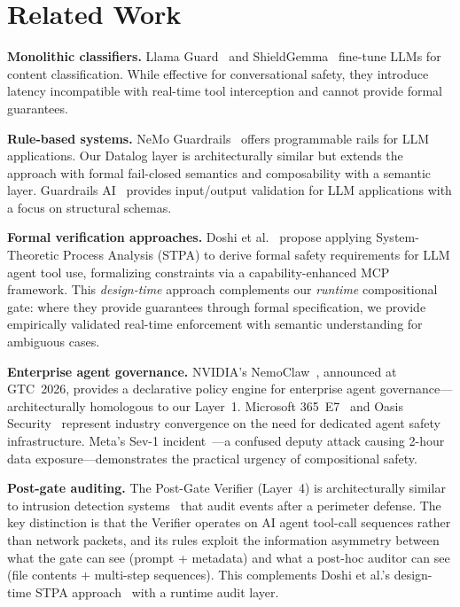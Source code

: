 \documentclass[conference]{IEEEtran}
\begin{document}
\section{Related Work}

\textbf{Monolithic classifiers.} Llama Guard~\cite{inan2023llamaguard} and ShieldGemma~\cite{zeng2024shieldgemma} fine-tune LLMs for content classification. While effective for conversational safety, they introduce latency incompatible with real-time tool interception and cannot provide formal guarantees.

\textbf{Rule-based systems.} NeMo Guardrails~\cite{rebedea2023nemoguardrails} offers programmable rails for LLM applications. Our Datalog layer is architecturally similar but extends the approach with formal fail-closed semantics and composability with a semantic layer. Guardrails AI~\cite{guardrailsai2024} provides input/output validation for LLM applications with a focus on structural schemas.

\textbf{Formal verification approaches.} Doshi et al.~\cite{doshi2026verifiable} propose applying System-Theoretic Process Analysis (STPA) to derive formal safety requirements for LLM agent tool use, formalizing constraints via a capability-enhanced MCP framework. This \emph{design-time} approach complements our \emph{runtime} compositional gate: where they provide guarantees through formal specification, we provide empirically validated real-time enforcement with semantic understanding for ambiguous cases.

\textbf{Enterprise agent governance.} NVIDIA's NemoClaw~\cite{nvidia2026nemoclaw}, announced at GTC~2026, provides a declarative policy engine for enterprise agent governance---architecturally homologous to our Layer~1. Microsoft 365~E7~\cite{microsoft2026e7} and Oasis Security~\cite{oasis2026funding} represent industry convergence on the need for dedicated agent safety infrastructure. Meta's Sev-1 incident~\cite{meta2026sev1}---a confused deputy attack causing 2-hour data exposure---demonstrates the practical urgency of compositional safety.

\textbf{Post-gate auditing.} The Post-Gate Verifier (Layer~4) is architecturally similar to intrusion detection systems~\cite{liao2013intrusion} that audit events after a perimeter defense. The key distinction is that the Verifier operates on AI agent tool-call sequences rather than network packets, and its rules exploit the information asymmetry between what the gate can see (prompt + metadata) and what a post-hoc auditor can see (file contents + multi-step sequences). This complements Doshi et al.'s design-time STPA approach~\cite{doshi2026verifiable} with a runtime audit layer.
\end{document}
